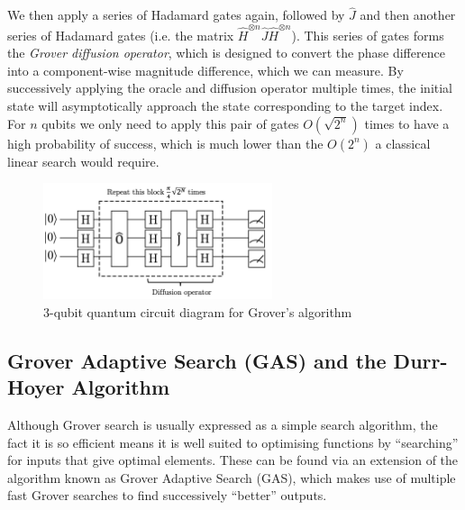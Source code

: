 \documentclass{article}[11pt]
\begin{document}
We then apply a series of Hadamard gates again, followed by $\hat J$ and then another series of Hadamard gates (i.e. the matrix $\hat H^{\otimes n}\hat J\hat H^{\otimes n}$). This series of gates forms the \textit{Grover diffusion operator}, which is designed to convert the phase difference into a component-wise magnitude difference\cite{candela}, which we can measure. By successively applying the oracle and diffusion operator multiple times, the initial state will asymptotically approach the state corresponding to the target index. For $n$ qubits we only need to apply this pair of gates $O(\sqrt{2^n})$ times to have a high probability of success,\cite{grover,candela} which is much lower than the $O(2^n)$ a classical linear search would require.

\begin{figure}[H]
\centering
\includegraphics[width=0.6\textwidth]{Pictures/groversketch.png}
\caption{3-qubit quantum circuit diagram for Grover's algorithm}
\end{figure}

\subsection{Grover Adaptive Search (GAS) and the Durr-Hoyer Algorithm}\label{section:GAS}
Although Grover search is usually expressed as a simple search algorithm, the fact it is so efficient means it is well suited to optimising functions by ``searching'' for inputs that give optimal elements. These can be found via an extension of the algorithm known as Grover Adaptive Search (GAS), which makes use of multiple fast Grover searches to find successively ``better'' outputs.
\end{document}
